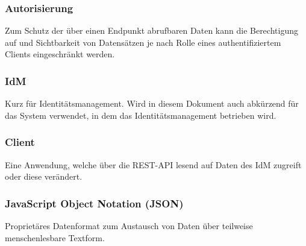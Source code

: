 \subsubsection*{Autorisierung}

Zum Schutz der über einen Endpunkt abrufbaren Daten kann die Berechtigung auf und Sichtbarkeit von Datensätzen je nach Rolle eines authentifiziertem Clients eingeschränkt werden.

\subsubsection*{IdM}
Kurz für Identitätsmanagement. Wird in diesem Dokument auch abkürzend für das System verwendet, in dem das Identitätsmanagement betrieben wird.

\subsubsection*{Client}

Eine Anwendung, welche über die REST-API lesend auf Daten des IdM zugreift oder diese verändert.

\subsubsection*{JavaScript Object Notation (JSON)}

Proprietäres Datenformat zum Austausch von Daten über teilweise menschenlesbare Textform.
